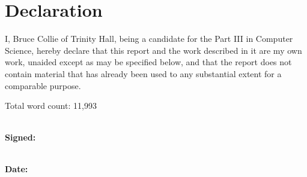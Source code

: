 \section*{Declaration}

I, Bruce Collie of Trinity Hall, being a candidate for the Part III in Computer
Science, hereby declare that this report and the work described in it are my own
work, unaided except as may be specified below, and that the report does not
contain material that has already been used to any substantial extent for a
comparable purpose.

\vspace{0.5cm}

\noindent
Total word count: 11,993

\vspace{0.5cm}

\noindent
\\\textbf{Signed:}

\vspace{0.5cm}

\noindent
\\\textbf{Date:}

